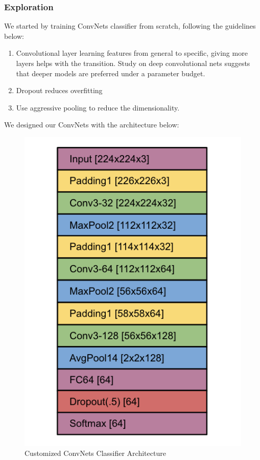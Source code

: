 \documentclass[journal, 10pt]{IEEEtran}
\begin{document}
  \subsubsection{Exploration}
  We started by training ConvNets classifier from scratch, following the guidelines below:
  \begin{enumerate}
    \item Convolutional layer learning features from general to specific, giving more layers helps with the transition. Study on deep convolutional nets suggests that deeper models are preferred under a parameter budget\cite{Deep2013}.
    \item Dropout reduces overfitting \cite{Dropout} \cite{Alex2014}
    \item Use aggressive pooling to reduce the dimensionality.
  \end{enumerate}
  We designed our ConvNets with the architecture below:
  \begin{figure}[H]
    \centering
    \includegraphics[scale=0.4]{cnn_arch}
    \caption{Customized ConvNets Classifier Architecture}
    \label{cnn_arch}
  \end{figure}
\end{document}
